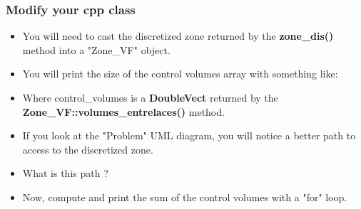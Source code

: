 \documentclass[10pt, hyperref={unicode=true,pdfusetitle, bookmarks=true,bookmarksnumbered=false,bookmarksopen=false, breaklinks=false,pdfborder={0 0 1},backref=true,colorlinks=true,linkcolor=darkblue,pageanchor, urlcolor=darkblue}]{beamer}
\begin{document}
\begin{frame}
\frametitle{Modify your cpp class}
\begin{block}{}

\begin{itemize}
\item You will need to cast the discretized zone returned by the \textbf{zone\_dis()} method into a "Zone\_VF" object.

\item You will print the size of the control volumes array with something like:
\begin{center}
\end{center}

\item Where control\_volumes is a \textbf{DoubleVect} returned by the \textbf{Zone\_VF::volumes\_entrelaces()} method.
\item If you look at the "Problem" UML diagram, you will notice a better path to access to the discretized zone.
\item What is this path ?
\item Now, compute and print the sum of the control volumes with a "for" loop.

\end{itemize}

\end{block}
\end{frame}
\end{document}
